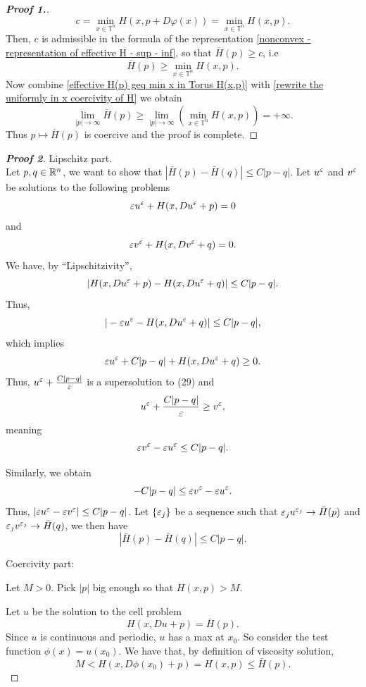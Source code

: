 \documentclass[12pt, oneside]{amsart}  	%
\begin{document}
\begin{proof}[\textbf{Proof 1.}]
\begin{equation*}
c = \min_{x\in \mathbb{T}^n} H(x,p+D\varphi(x)) = \min_{x\in \mathbb{T}^n} H(x,p).
\end{equation*}
Then, $c$ is admissible in the formula of the representation \eqref{nonconvex - representation of effective H - sup - inf}, so that $\overline{H}(p)\geq c$, i.e
\begin{equation}\label{effective H(p) geq min x in Torus H(x,p)}
\overline{H}(p) \geq \min_{x\in \mathbb{T}^n} H(x,p). 
\end{equation}
Now combine \eqref{effective H(p) geq min x in Torus H(x,p)} with \eqref{rewrite the uniformly in x coercivity of H} we obtain 
\begin{equation*}
\lim_{|p|\longrightarrow \infty} \overline{H}(p) \geq \lim_{|p|\longrightarrow \infty} \left( \min_{x\in \mathbb{T}^n} H(x,p) \right) = +\infty.
\end{equation*}
Thus $p\longmapsto \overline{H}(p)$ is coercive and the proof is complete.
\end{proof}

\begin{proof}[\textbf{Proof 2}] Lipschitz part.\\
Let $p, q\in \mathbb{R}^n$, we want to show that $|\bar{H}(p)-\bar{H}(q)|\le C|p-q|$. Let $u^\varepsilon$ and $v^\varepsilon$ be solutions to the following problems
\begin{equation}
		\varepsilon u^\varepsilon + H(x, Du^\varepsilon + p)=0
\end{equation}
	and
\begin{equation}
		\varepsilon v^\varepsilon + H(x, Dv^\varepsilon + q)=0.
\end{equation}
We have, by ``Lipschitzivity'',
	$$|H(x, Du^\varepsilon + p) - H(x, Du^\varepsilon + q)| \le C|p-q|.$$
Thus,
	$$|-\varepsilon u^\varepsilon - H(x, Du^\varepsilon + q)| \le C|p-q|,$$
which implies
	\begin{equation}
	 \varepsilon u^\varepsilon+C|p-q| + H(x, Du^\varepsilon +q) \ge 0. \label{inequality_1}
	\end{equation}
	Thus, $u^\varepsilon + \frac{C|p-q|}{\varepsilon}$ is a supersolution to (29) and 
	$$u^\varepsilon + \frac{C|p-q|}{\varepsilon}\ge v^\varepsilon,$$
	meaning $$\varepsilon v^\varepsilon-\varepsilon u^\varepsilon \le C|p-q|.$$ 
	
	Similarly, we obtain
	$$-C|p-q| \le \varepsilon v^\varepsilon-\varepsilon u^\varepsilon .$$
	Thus, $|\varepsilon u^\varepsilon - \varepsilon v^\varepsilon| \le C|p-q|$. Let $\{ \varepsilon_j\}$ be a sequence such that $\varepsilon_j u^{\varepsilon_j} \to \bar{H}(p)$ and $\varepsilon_j v^{\varepsilon_j} \to \bar{H}(q)$, we then have
	$$|\bar{H}(p)- \bar{H}(q)| \le C|p-q|.$$
		
	Coercivity part: 

	Let $M>0$. Pick $|p|$ big enough so that $H(x,p)>M$.
		
	Let $u$ be the solution to the cell problem
	$$H(x, Du+p) = \bar{H}(p).$$
	Since $u$ is continuous and periodic, $u$ has a max at $x_0$. So consider the test function $\phi(x)={u(x_0)}$. We have that, by definition of viscosity solution, 
	$$M< H(x,D\phi(x_0)+p)=H(x,p) \le \bar{H}(p).$$
\end{proof}
\end{document}
